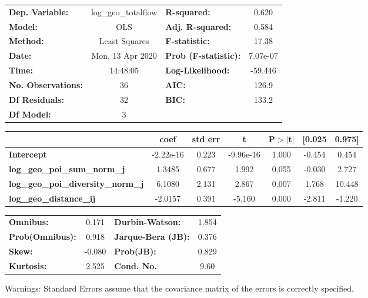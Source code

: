 \begin{center}
\begin{tabular}{lclc}
\toprule
\textbf{Dep. Variable:}                    & log\_geo\_totalflow & \textbf{  R-squared:         } &     0.620   \\
\textbf{Model:}                            &         OLS         & \textbf{  Adj. R-squared:    } &     0.584   \\
\textbf{Method:}                           &    Least Squares    & \textbf{  F-statistic:       } &     17.38   \\
\textbf{Date:}                             &   Mon, 13 Apr 2020  & \textbf{  Prob (F-statistic):} &  7.07e-07   \\
\textbf{Time:}                             &       14:48:05      & \textbf{  Log-Likelihood:    } &   -59.446   \\
\textbf{No. Observations:}                 &            36       & \textbf{  AIC:               } &     126.9   \\
\textbf{Df Residuals:}                     &            32       & \textbf{  BIC:               } &     133.2   \\
\textbf{Df Model:}                         &             3       & \textbf{                     } &             \\
\bottomrule
\end{tabular}
\begin{tabular}{lcccccc}
                                           & \textbf{coef} & \textbf{std err} & \textbf{t} & \textbf{P$> |$t$|$} & \textbf{[0.025} & \textbf{0.975]}  \\
\midrule
\textbf{Intercept}                         &    -2.22e-16  &        0.223     & -9.96e-16  &         1.000        &       -0.454    &        0.454     \\
\textbf{log\_geo\_poi\_sum\_norm\_j}       &       1.3485  &        0.677     &     1.992  &         0.055        &       -0.030    &        2.727     \\
\textbf{log\_geo\_poi\_diversity\_norm\_j} &       6.1080  &        2.131     &     2.867  &         0.007        &        1.768    &       10.448     \\
\textbf{log\_geo\_distance\_ij}            &      -2.0157  &        0.391     &    -5.160  &         0.000        &       -2.811    &       -1.220     \\
\bottomrule
\end{tabular}
\begin{tabular}{lclc}
\textbf{Omnibus:}       &  0.171 & \textbf{  Durbin-Watson:     } &    1.854  \\
\textbf{Prob(Omnibus):} &  0.918 & \textbf{  Jarque-Bera (JB):  } &    0.376  \\
\textbf{Skew:}          & -0.080 & \textbf{  Prob(JB):          } &    0.829  \\
\textbf{Kurtosis:}      &  2.525 & \textbf{  Cond. No.          } &     9.60  \\
\bottomrule
\end{tabular}
\end{center}

Warnings: \newline
 [1] Standard Errors assume that the covariance matrix of the errors is correctly specified.